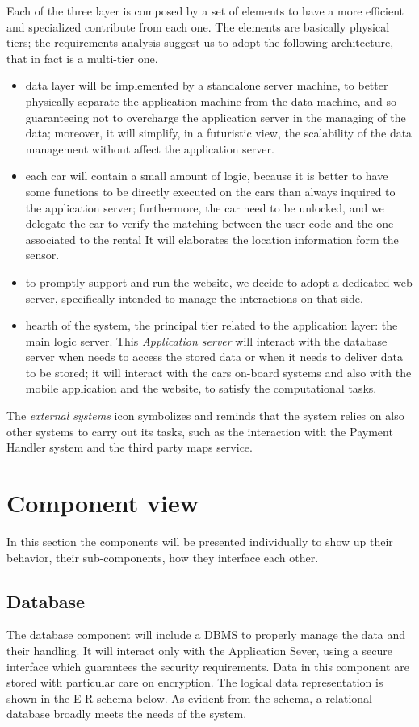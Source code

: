 \documentclass{scrreprt}
\begin{document}
Each of the three layer is composed by a set of elements to have a more efficient and specialized contribute from each one.
The elements are basically physical tiers; the requirements analysis suggest us to adopt the following architecture, that in fact is a multi-tier one.
\begin{itemize}
\item data layer will be implemented by a standalone server machine, to better physically separate the application machine from the data machine, and so guaranteeing not to overcharge the application server in the managing of the data; moreover, it will simplify, in a futuristic view, the scalability of the data management without affect the application server.
\item each car will contain a small amount of logic, because it is better to have some functions to be directly executed on the cars than always inquired to the application server; furthermore, the car need to be unlocked, and we delegate the car to verify the matching between the user code and the one associated to the rental It will elaborates the location information form the sensor.
\item to promptly support and run the website, we decide to adopt a dedicated web server, specifically intended to manage the interactions on that side.
\item hearth of the system, the principal tier related to the application layer: the main logic server. This \emph{Application server} will interact with the database server when needs to access the stored data or when it needs to deliver data to be stored; it will interact with the cars on-board systems and also with the mobile application and the website, to satisfy the computational tasks.
\end{itemize}
The \emph{external systems} icon symbolizes and reminds that the system relies on also other systems to carry out its tasks, such as the interaction with the Payment Handler system and the third party maps service.

\section{Component view}
In this section the components will be presented individually to show up their behavior, their sub-components, how they interface each other.

\subsection{Database}
The database component will include a DBMS to properly manage the data and their handling. It will interact only with the Application Sever, using a secure interface which guarantees the security requirements. Data in this component are stored with particular care on encryption.
The logical data representation is shown in the E-R schema below.
As evident from the schema, a relational database broadly meets the needs of the system.
\end{document}
